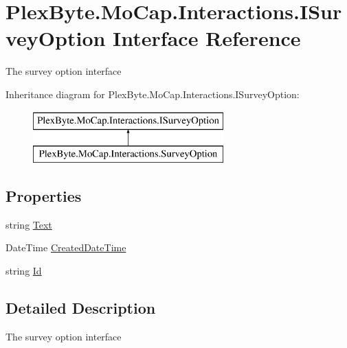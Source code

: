 \hypertarget{interface_plex_byte_1_1_mo_cap_1_1_interactions_1_1_i_survey_option}{}\section{Plex\+Byte.\+Mo\+Cap.\+Interactions.\+I\+Survey\+Option Interface Reference}
\label{interface_plex_byte_1_1_mo_cap_1_1_interactions_1_1_i_survey_option}


The survey option interface  


Inheritance diagram for Plex\+Byte.\+Mo\+Cap.\+Interactions.\+I\+Survey\+Option\+:\begin{figure}[H]
\begin{center}
\leavevmode
\includegraphics[height=2.000000cm]{interface_plex_byte_1_1_mo_cap_1_1_interactions_1_1_i_survey_option}
\end{center}
\end{figure}
\subsection*{Properties}
\begin{DoxyCompactItemize}
\item 
string \hyperlink{interface_plex_byte_1_1_mo_cap_1_1_interactions_1_1_i_survey_option_a49da68b97f711aa9708ad94b512a8be9}{Text}
\item 
Date\+Time \hyperlink{interface_plex_byte_1_1_mo_cap_1_1_interactions_1_1_i_survey_option_a7fce51617a89b3d3b4ebd804b8b9c6af}{Created\+Date\+Time}
\item 
string \hyperlink{interface_plex_byte_1_1_mo_cap_1_1_interactions_1_1_i_survey_option_a837c0227b5d8bf74254e1f218eb37148}{Id}
\end{DoxyCompactItemize}


\subsection{Detailed Description}
The survey option interface 




